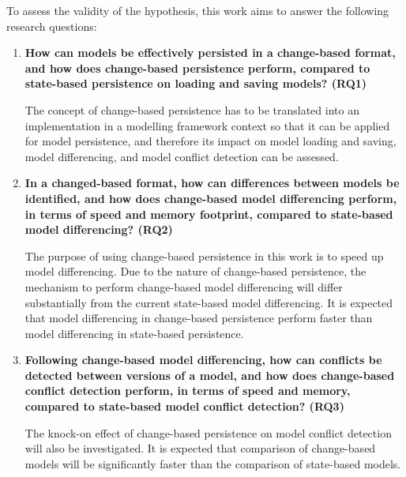 To assess the validity of the hypothesis, this work aims to answer the following research questions: 
\begin{enumerate} 
\item \textbf{How can models be effectively persisted in a change-based format, and how does change-based persistence perform, compared to state-based persistence on loading and saving models? (RQ1)} 

The concept of change-based persistence has to be translated into an implementation in a modelling framework context so that it can be applied for model persistence, and therefore its impact on model loading and saving, model differencing, and model conflict detection can be assessed.

\item \textbf{In a changed-based format, how can differences between models be identified, and how does change-based model differencing perform, in terms of speed and memory footprint, compared to state-based model differencing? (RQ2)} 

The purpose of using change-based persistence in this work is to speed up model differencing. Due to the nature of change-based persistence, the mechanism to perform change-based model differencing will differ substantially from the current state-based model differencing. It is expected that model differencing in change-based persistence perform faster than model differencing in state-based persistence.        

\item \textbf{Following change-based model differencing, how can conflicts be detected between versions of a model, and  how does change-based conflict detection perform, in terms of speed and memory, compared to state-based model conflict detection? (RQ3)} 

The knock-on effect of change-based persistence on model conflict detection will also be investigated. It is expected that comparison of change-based models will be significantly faster than the comparison of state-based models.

%

\end{enumerate}

